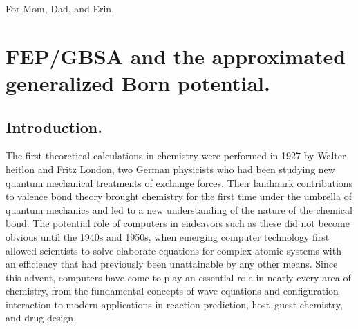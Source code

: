 \documentclass[12pt]{report}
\begin{document}

\newpage
\thispagestyle{empty}
\mbox{}
\newpage
\thispagestyle{empty}
\vspace*{7cm}
\begin{center}

For Mom, Dad, and Erin.

\end{center}
\newpage
\thispagestyle{empty}
\mbox{}
\newpage



\setcounter{page}{1}
\pagestyle{plain}

\chapter{FEP/GBSA and the approximated generalized Born potential.}
\label{ch-gbsa}

\section{Introduction.}

The first theoretical calculations in chemistry were performed in 1927 by Walter heitlon and Fritz London, two German physicists who had been studying new quantum mechanical treatments of exchange forces. Their landmark contributions to valence bond theory \cite{heitlon} brought chemistry for the first time under the umbrella of quantum mechanics and led to a new understanding of the nature of the chemical bond. \cite{pauling} The potential role of computers in endeavors such as these did not become obvious until the 1940s and 1950s, \cite{boys} when emerging computer technology first allowed scientists to solve elaborate equations for complex atomic systems with an efficiency that had previously been unattainable by any other means. Since this advent, computers have come to play an essential role in nearly every area of chemistry, from the fundamental concepts of wave equations and configuration interaction to modern applications in reaction prediction, host--guest chemistry, and drug design. \cite{smith}
 
\end{document}
